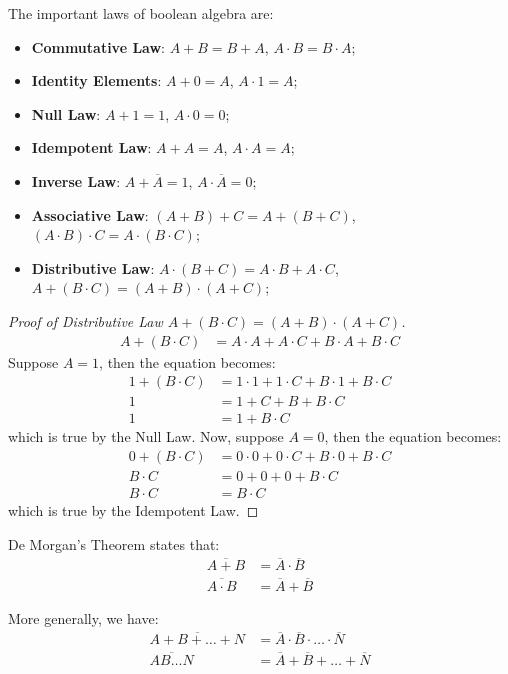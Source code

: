\begin{definition}\label{def:boolean-algebra-laws}
    The important laws of boolean algebra are:
    \begin{itemize}
        \item \textbf{Commutative Law}: $A+B = B+A$, $A\cdot B = B\cdot A$;
        \item \textbf{Identity Elements}: $A+0 = A$, $A\cdot 1 = A$;
        \item \textbf{Null Law}: $A+1 = 1$, $A\cdot 0 = 0$;
        \item \textbf{Idempotent Law}: $A+A = A$, $A\cdot A = A$;
        \item \textbf{Inverse Law}: $A+\overline{A} = 1$, $A\cdot\overline{A} = 0$;
        \item \textbf{Associative Law}: $(A+B)+C = A+(B+C)$, $(A\cdot B)\cdot C = A\cdot(B\cdot C)$;
        \item \textbf{Distributive Law}: $A\cdot(B+C) = A\cdot B + A\cdot C$, $A+(B\cdot C) = (A+B)\cdot(A+C)$;
    \end{itemize}
\end{definition}

\begin{proof}[Proof of Distributive Law $A+(B\cdot C) = (A+B)\cdot(A+C)$]
    \begin{align*}
        A+(B\cdot C) &= A\cdot A + A\cdot C + B\cdot A + B\cdot C
    \end{align*}
    Suppose $A=1$, then the equation becomes:
    \begin{align*}
        1+(B\cdot C) &= 1\cdot 1 + 1\cdot C + B\cdot 1 + B\cdot C\\
        1 &= 1 + C + B + B\cdot C\\
        1 &= 1 + B\cdot C
    \end{align*}
    which is true by the Null Law. Now, suppose $A=0$, then the equation becomes:
    \begin{align*}
        0+(B\cdot C) &= 0\cdot 0 + 0\cdot C + B\cdot 0 + B\cdot C\\
        B\cdot C &= 0 + 0 + 0 + B\cdot C\\
        B\cdot C &= B\cdot C
    \end{align*}
    which is true by the Idempotent Law.
\end{proof}

\begin{theorem}\label{def:de-morgans-theorem}
    De Morgan's Theorem states that:
    \begin{align*}
        \overline{A+B} &= \overline{A}\cdot\overline{B}\\
        \overline{A\cdot B} &= \overline{A}+\overline{B}
    \end{align*}

    More generally, we have:
    \begin{align*}
        \overline{A+B+\dots+N} &= \overline{A}\cdot\overline{B}\cdot\dots\cdot\overline{N}\\
        \overline{AB\dots N} &= \overline{A}+\overline{B}+\dots+\overline{N}
    \end{align*}
\end{theorem}

